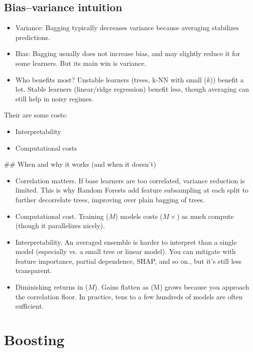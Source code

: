 \subsection{Bias–variance intuition}

\begin{itemize}
	\item Variance: Bagging typically decreases variance because averaging stabilizes predictions.
	\item Bias: Bagging usually does not increase bias, and may slightly reduce it for some learners. But its main win is variance.
	\item Who benefits most? Unstable learners (\eg trees, k-NN with small ($k$)) benefit a lot. Stable learners (\eg linear/ridge regression) benefit less, though averaging can still help in noisy regimes.
\end{itemize}

Their are some costs: 
\begin{itemize}
	\item Interpretability
	\item Computational costs
\end{itemize}

## When and why it works (and when it doesn't)

\begin{itemize}
	\item Correlation matters. If base learners are too correlated, variance reduction is limited. This is why Random Forests add feature subsampling at each split to further decorrelate trees, improving over plain bagging of trees.
	\item Computational cost. Training ($M$) models costs ($M\times$) as much compute (though it parallelizes nicely).
	\item Interpretability. An averaged ensemble is harder to interpret than a single model (especially vs. a small tree or linear model). You can mitigate with feature importance, partial dependence, SHAP, and so on., but it's still less transparent.
	\item Diminishing returns in ($M$). Gains flatten as (M) grows because you approach the correlation floor. In practice, tens to a few hundreds of models are often sufficient.
\end{itemize}

\section{Boosting}

